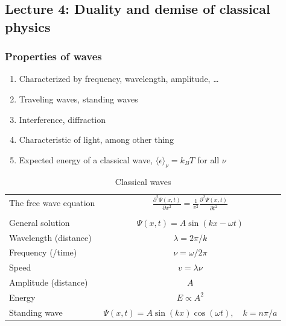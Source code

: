 \documentclass[11pt]{article}
\begin{document}
\subsection{Lecture 4: Duality and demise of classical physics}
\label{sec:orgde7c411}
\subsubsection{Properties of waves}
\label{sec:orgc5982a8}
\begin{enumerate}
\item Characterized by frequency, wavelength, amplitude, \ldots
\item Traveling waves, standing waves
\item Interference, diffraction
\item Characteristic of light, among other thing
\item Expected energy of a classical wave, \(\langle \epsilon \rangle _\nu = k_B T\) for all \(\nu\)
\end{enumerate}

\begin{table}
\begin{center}
    \caption{Classical waves}
    \begin{tabular}{|lc|}
     \hline
The free wave equation & $\displaystyle \frac{ \partial^2 \Psi(x,t)}{\partial x^2} = \frac{1}{v^2}\frac{\partial^2 \Psi(x,t)}{\partial t^2}$ \\
\\
General solution & \(\Psi(x,t) = A \sin(kx -\omega t)\) \\
Wavelength (distance) & \( \lambda = 2\pi/k \) \\
Frequency (/time) & \( \nu =\omega/2\pi \) \\
Speed & \( v= \lambda \nu \) \\
Amplitude (distance) & \(A\) \\
Energy & \( E \propto A^2 \) \\
Standing wave & \(\Psi(x,t) = A \sin(kx)\cos(\omega t), \quad k =n\pi/a\) \\
\hline
\end{tabular}
\end{center}
\end{table}
\end{document}
